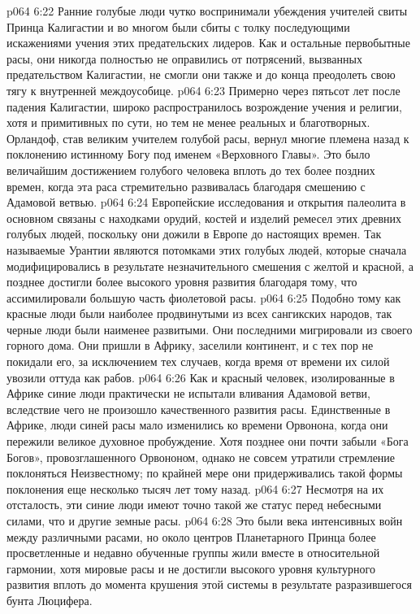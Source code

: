 \vs p064 6:22 Ранние голубые люди чутко воспринимали убеждения учителей свиты Принца Калигастии и во многом были сбиты с толку последующими искажениями учения этих предательских лидеров. Как и остальные первобытные расы, они никогда полностью не оправились от потрясений, вызванных предательством Калигастии, не смогли они также и до конца преодолеть свою тягу к внутренней междоусобице.
\vs p064 6:23 Примерно через пятьсот лет после падения Калигастии, широко распространилось возрождение учения и религии, хотя и примитивных по сути, но тем не менее реальных и благотворных. Орландоф, став великим учителем голубой расы, вернул многие племена назад к поклонению истинному Богу под именем «Верховного Главы». Это было величайшим достижением голубого человека вплоть до тех более поздних времен, когда эта раса стремительно развивалась благодаря смешению с Адамовой ветвью.
\vs p064 6:24 Европейские исследования и открытия палеолита в основном связаны с находками орудий, костей и изделий ремесел этих древних голубых людей, поскольку они дожили в Европе до настоящих времен. Так называемые  Урантии являются потомками этих голубых людей, которые сначала модифицировались в результате незначительного смешения с желтой и красной, а позднее достигли более высокого уровня развития благодаря тому, что ассимилировали большую часть фиолетовой расы.
\vs p064 6:25 \bibnobreakspace {} Подобно тому как красные люди были наиболее продвинутыми из всех сангикских народов, так черные люди были наименее развитыми. Они последними мигрировали из своего горного дома. Они пришли в Африку, заселили континент, и с тех пор не покидали его, за исключением тех случаев, когда время от времени их силой увозили оттуда как рабов.
\vs p064 6:26 Как и красный человек, изолированные в Африке синие люди практически не испытали вливания Адамовой ветви, вследствие чего не произошло качественного развития расы. Единственные в Африке, люди синей расы мало изменились ко времени Орвонона, когда они пережили великое духовное пробуждение. Хотя позднее они почти забыли «Бога Богов», провозглашенного Орвононом, однако не совсем утратили стремление поклоняться Неизвестному; по крайней мере они придерживались такой формы поклонения еще несколько тысяч лет тому назад.
\vs p064 6:27 Несмотря на их отсталость, эти синие люди имеют точно такой же статус перед небесными силами, что и другие земные расы.
\vs p064 6:28 \pc Это были века интенсивных войн между различными расами, но около центров Планетарного Принца более просветленные и недавно обученные группы жили вместе в относительной гармонии, хотя мировые расы и не достигли высокого уровня культурного развития вплоть до момента крушения этой системы в результате разразившегося бунта Люцифера.

